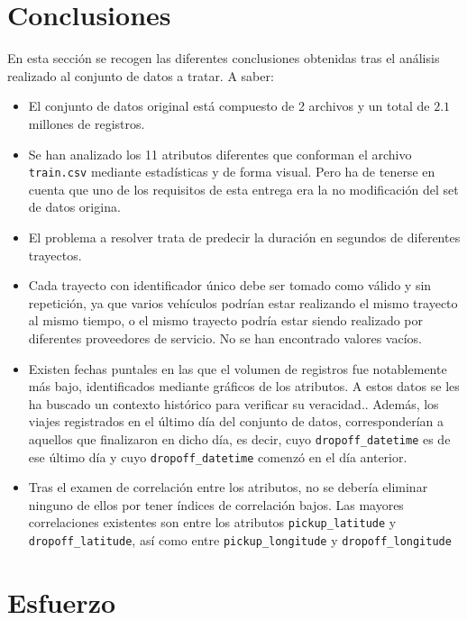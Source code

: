 \documentclass[12pt]{article}
\begin{document}
\newpage


\section{Conclusiones}
En esta sección se recogen las diferentes conclusiones obtenidas tras el análisis realizado al conjunto de datos a tratar. A saber:
\begin{itemize}
    \item El conjunto de datos original está compuesto de 2 archivos y un total de $2.1$ millones de registros.
    \item Se han analizado los 11 atributos diferentes que conforman el archivo \texttt{train.csv} mediante estadísticas y de forma visual. Pero ha de tenerse en cuenta que uno de los requisitos de esta entrega era la no modificación del set de datos origina.
    \item El problema a resolver trata de predecir la duración en segundos de diferentes trayectos.
    \item Cada trayecto con identificador único debe ser tomado como válido y sin repetición, ya que varios vehículos podrían estar realizando el mismo trayecto al mismo tiempo, o el mismo trayecto podría estar siendo realizado por diferentes proveedores de servicio. No se han encontrado valores vacíos. 
    \item Existen fechas puntales en las que el volumen de registros fue notablemente más bajo, identificados mediante gráficos de los atributos. A estos datos se les ha buscado un contexto histórico para verificar su veracidad.\cite{BBC}. Además, los viajes registrados en el último día del conjunto de datos, corresponderían a aquellos que finalizaron en dicho día, es decir, cuyo \texttt{dropoff\_datetime} es de ese último día y cuyo \texttt{dropoff\_datetime} comenzó en el día anterior.
    \item Tras el examen de correlación entre los atributos, no se debería eliminar ninguno de ellos por tener índices de correlación bajos. Las mayores correlaciones existentes son entre los atributos \texttt{pickup\_latitude} y \texttt{dropoff\_latitude}, así como  entre \texttt{pickup\_longitude} y \texttt{dropoff\_longitude}
    
\end{itemize}
\newpage

\section{Esfuerzo}
\end{document}
